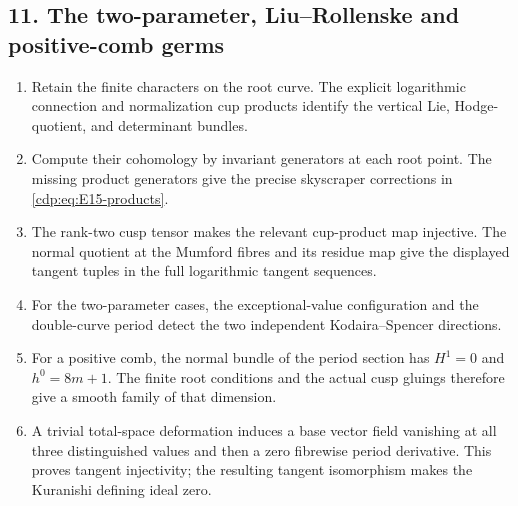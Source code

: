 \subsection*{11. The two-parameter, Liu--Rollenske and positive-comb germs}
\RungOne
\begin{enumerate}[label=\arabic*.,leftmargin=*]
\item Retain the finite characters on the root curve.  The
explicit logarithmic connection and normalization cup products
identify the vertical Lie, Hodge-quotient, and determinant bundles.
\item Compute their cohomology by invariant generators at each
root point.  The missing product generators give the precise
skyscraper corrections in \eqref{cdp:eq:E15-products}.
\item The rank-two cusp tensor makes the relevant cup-product
map injective.  The normal quotient at the Mumford fibres and its
residue map give the displayed tangent tuples in the full
logarithmic tangent sequences.
\item For the two-parameter cases, the exceptional-value
configuration and the double-curve period detect the two
independent Kodaira--Spencer directions.
\item For a positive comb, the normal bundle of the period
section has $H^1=0$ and $h^0=8m+1$.  The finite root conditions
and the actual cusp gluings therefore give a smooth family of
that dimension.
\item A trivial total-space deformation induces a base vector
field vanishing at all three distinguished values and then a
zero fibrewise period derivative.  This proves tangent
injectivity; the resulting tangent isomorphism makes the
Kuranishi defining ideal zero.
\end{enumerate}

